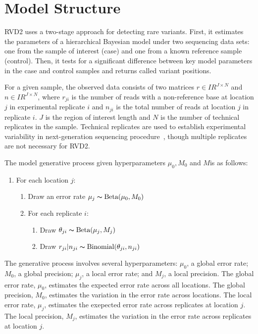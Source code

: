 \documentclass{bioinfo}
\newcommand{\RR}{I\!\!R} %
\begin{document}
\section{Model Structure}\label{sec:model_structure}

RVD2 uses a two-stage approach for detecting rare variants. First, it estimates the parameters of a hierarchical Bayesian model under two sequencing data sets: one from the sample of interest (case) and one from a known reference sample (control). Then, it tests for a significant difference between key model parameters in the case and control samples and returns called variant positions.

For a given sample, the observed data consists of two matrices $r \in \RR^{J \times N}$ and $n \in \RR^{J \times N}$, where $r_{ji}$ is the number of reads with a non-reference base at location $j$ in experimental replicate $i$ and $n_{ji}$ is the total number of reads at location $j$ in replicate $i$. $ J $ is the region of interest length and $ N $ is the number of technical replicates in the sample.\label{replicate definition} Technical replicates are used to establish experimental variability in next-generation sequencing procedure~\citep{quackenbush2002microarray,robasky2013role}, though multiple replicates are not necessary for RVD2.

The model generative process given hyperparameters $ \mu_0, M_0$ and $ M $is as follows:

\begin{enumerate}[noitemsep]
	\item For each location $j$:
	\begin{enumerate}[noitemsep]
		\item Draw an error rate $\mu_j \thicksim \text{Beta}(\mu_0, M_0)$
		\item For each replicate $i$:
		\begin{enumerate}
			\item Draw $\theta_{ji} \thicksim \text{Beta}(\mu_j, M_j)$
			\item Draw $r_{ji}|n_{ji} \thicksim \text{Binomial}(\theta_{ji}, n_{ji})$
		\end{enumerate}
	\end{enumerate}
\end{enumerate}


The generative process involves several hyperparameters: $\mu_0$, a global error rate; $M_0$, a global precision;  $ \mu_j $, a local error rate; and $M_j$, a local precision. The global error rate, $\mu_0$, estimates the expected error rate across all locations. The global precision, $M_0$, estimates the variation in the error rate  across locations. The local error rate, $ \mu_j $, estimates the exepected error rate across replicates at location $ j $. The local precision, $M_j$, estimates the variation in the error rate across replicates at location $j$.
\end{document}
